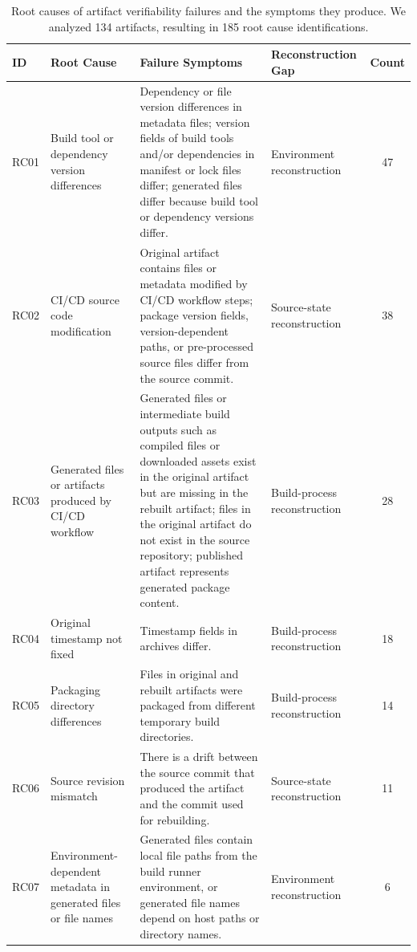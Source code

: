 
\begin{table}[t]
\centering
\scriptsize
\setlength{\tabcolsep}{3.2pt}
\renewcommand{\arraystretch}{1.12}
\caption{Root causes of artifact verifiability failures and the symptoms they produce. We analyzed 134 artifacts, resulting in 185 root cause identifications.}
\label{tab:failure-root-causes}
\begin{tabularx}{\textwidth}{@{}p{} p{} Y p{0.18\textwidth} c@{}}
\toprule
\textbf{ID} & \textbf{Root Cause} & \textbf{Failure Symptoms} & \textbf{Reconstruction Gap} & \textbf{Count} \\
\midrule
RC01 & Build tool or dependency version differences & Dependency or file version differences in metadata files; version fields of build tools and/or dependencies in manifest or lock files differ; generated files differ because build tool or dependency versions differ. & Environment reconstruction & 47 \\
\midrule
RC02 & CI/CD source code modification & Original artifact contains files or metadata modified by CI/CD workflow steps; package version fields, version-dependent paths, or pre-processed source files differ from the source commit. & Source-state reconstruction & 38 \\
\midrule
RC03 & Generated files or artifacts produced by CI/CD workflow & Generated files or intermediate build outputs such as compiled files or downloaded assets exist in the original artifact but are missing in the rebuilt artifact; files in the original artifact do not exist in the source repository; published artifact represents generated package content. & Build-process reconstruction & 28 \\
\midrule
RC04 & Original timestamp not fixed & Timestamp fields in archives differ. & Build-process reconstruction & 18 \\
\midrule
RC05 & Packaging directory differences & Files in original and rebuilt artifacts were packaged from different temporary build directories. & Build-process reconstruction & 14 \\
\midrule
RC06 & Source revision mismatch & There is a drift between the source commit that produced the artifact and the commit used for rebuilding. & Source-state reconstruction & 11 \\
\midrule
RC07 & Environment-dependent metadata in generated files or file names & Generated files contain local file paths from the build runner environment, or generated file names depend on host paths or directory names. & Environment reconstruction & 6 \\

\end{tabularx}
\end{table}
